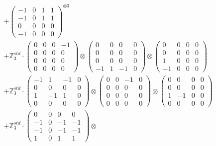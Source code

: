 \documentclass{article}
\begin{document}
{\begin{align}
        &+ \label{Rs16-Rc11-Solution-6-c16} \begin{pmatrix} -1 & 0 & 1 & 1 \\ -1 & 0 & 1 & 1 \\ 0 & 0 & 0 & 0 \\ -1 & 0 & 0 & 0 \end{pmatrix}^{\otimes 3} \\
        &+ \label{Rs16-Rc11-Solution-6-c17} \mathbb{Z}_3^{std} \cdot 
            \begin{pmatrix} 0 & 0 & 0 & -1 \\ 0 & 0 & 0 & 0 \\ 0 & 0 & 0 & 0 \\ 0 & 0 & 0 & 0 \end{pmatrix} \otimes 
            \begin{pmatrix} 0 & 0 & 0 & 0 \\ 0 & 0 & 0 & 0 \\ 0 & 0 & 0 & 0 \\ -1 & 1 & -1 & 0 \end{pmatrix} \otimes 
            \begin{pmatrix} 0 & 0 & 0 & 0 \\ 0 & 0 & 0 & 0 \\ 1 & 0 & 0 & 0 \\ -1 & 0 & 0 & 0 \end{pmatrix} \\ 
        &+ \label{Rs16-Rc11-Solution-6-c18} \mathbb{Z}_3^{std} \cdot 
            \begin{pmatrix} -1 & 1 & -1 & 0 \\ 0 & 0 & 0 & 0 \\ 1 & -1 & 1 & 0 \\ 0 & 0 & 0 & 0 \end{pmatrix} \otimes 
            \begin{pmatrix} 0 & 0 & -1 & 0 \\ 0 & 0 & 0 & 0 \\ 0 & 0 & 0 & 0 \\ 0 & 0 & 0 & 0 \end{pmatrix} \otimes 
            \begin{pmatrix} 0 & 0 & 0 & 0 \\ 0 & 0 & 0 & 0 \\ 1 & -1 & 0 & 0 \\ 0 & 0 & 0 & 0 \end{pmatrix} \\ 
        &+ \label{Rs16-Rc11-Solution-6-c19} \mathbb{Z}_3^{std} \cdot 
            \begin{pmatrix} 0 & 0 & 0 & 0 \\ -1 & 0 & -1 & -1 \\ -1 & 0 & -1 & -1 \\ 1 & 0 & 1 & 1 \end{pmatrix} \otimes 

\end{align}}
\end{document}
